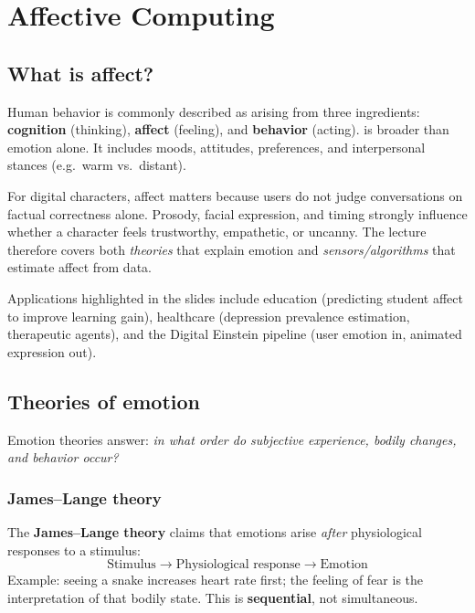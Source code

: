 \chapter{Affective Computing}
\label{ch:affective}


\section{What is affect?}

Human behavior is commonly described as arising from three ingredients: \textbf{cognition} (thinking), \textbf{affect} (feeling), and \textbf{behavior} (acting).  is broader than emotion alone. It includes moods, attitudes, preferences, and interpersonal stances (e.g.\ warm vs.\ distant).

For digital characters, affect matters because users do not judge conversations on factual correctness alone. Prosody, facial expression, and timing strongly influence whether a character feels trustworthy, empathetic, or uncanny. The lecture therefore covers both \emph{theories} that explain emotion and \emph{sensors/algorithms} that estimate affect from data.

Applications highlighted in the slides include education (predicting student affect to improve learning gain), healthcare (depression prevalence estimation, therapeutic agents), and the Digital Einstein pipeline (user emotion in, animated expression out).

\section{Theories of emotion}

Emotion theories answer: \emph{in what order do subjective experience, bodily changes, and behavior occur?}

\subsection{James--Lange theory}

The \textbf{James--Lange theory} claims that emotions arise \emph{after} physiological responses to a stimulus:
\[
\text{Stimulus} \rightarrow \text{Physiological response} \rightarrow \text{Emotion}
\]
Example: seeing a snake increases heart rate first; the feeling of fear is the interpretation of that bodily state. This is \textbf{sequential}, not simultaneous.

